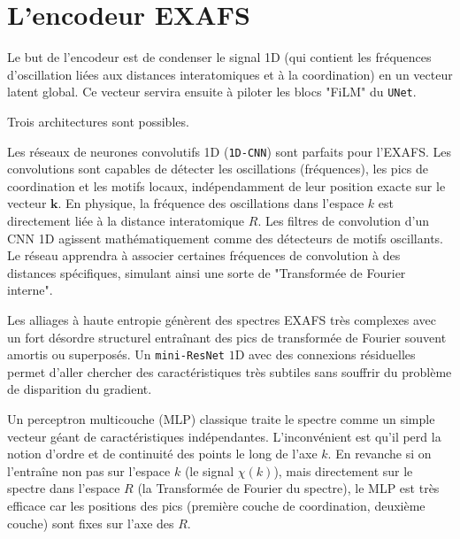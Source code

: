 \documentclass[12pt,a4paper,french]{book}
\begin{document}
\section{L'encodeur EXAFS}

Le but de l'encodeur est de condenser le signal 1D (qui contient les fréquences d'oscillation liées aux distances interatomiques et à la coordination) en un vecteur latent global. Ce vecteur servira ensuite à piloter les blocs "FiLM" du \verb+UNet+.



Trois architectures sont possibles.

Les réseaux de neurones convolutifs 1D (\verb+1D-CNN+) sont parfaits pour l'EXAFS. Les convolutions sont capables de détecter les oscillations (fréquences), les pics de coordination et les motifs locaux, indépendamment de leur position exacte sur le vecteur $\bm{k}$.
En physique, la fréquence des oscillations dans l'espace $k$ est directement liée à la distance interatomique $R$. Les filtres de convolution d'un CNN 1D agissent mathématiquement comme des détecteurs de motifs oscillants. Le réseau apprendra à associer certaines fréquences de convolution à des distances spécifiques, simulant ainsi une sorte de "Transformée de Fourier interne".

Les alliages à haute entropie génèrent des spectres EXAFS très complexes avec un fort désordre structurel entraînant des pics de transformée de Fourier souvent amortis ou superposés.
Un \verb+mini-ResNet+ $1\text{D}$ avec des connexions résiduelles permet d'aller chercher des caractéristiques très subtiles sans souffrir du problème de disparition du gradient.
 
Un perceptron multicouche (MLP) classique traite le spectre comme un simple vecteur géant de caractéristiques indépendantes. L'inconvénient est qu'il perd la notion d'ordre et de continuité des points le long de l'axe $k$. En revanche si on l'entraîne non pas sur l'espace $k$ (le signal $\chi(k)$), mais directement sur le spectre dans l'espace $R$ (la Transformée de Fourier du spectre), le MLP est très efficace car les positions des pics (première couche de coordination, deuxième couche) sont fixes sur l'axe des $R$.
 
\end{document}

